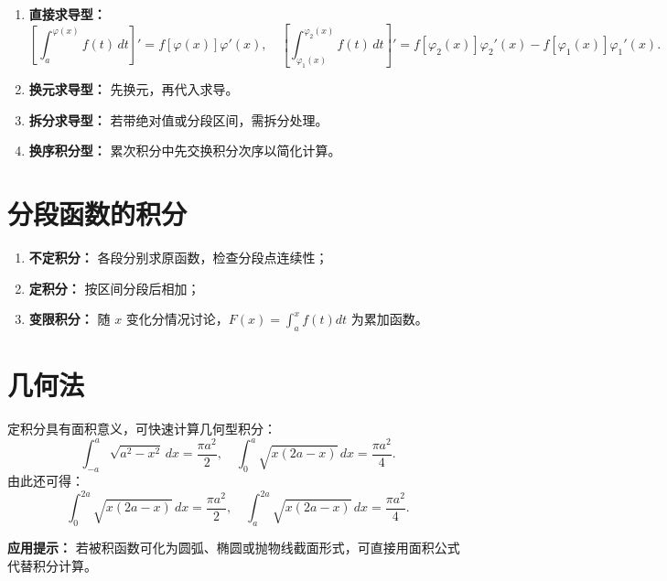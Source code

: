 \begin{enumerate}
    \item \textbf{直接求导型：}
          \[
              \left[\int_{a}^{\varphi(x)} f(t)\,dt\right]' = f[\varphi(x)]\varphi'(x),\quad
              \left[\int_{\varphi_1(x)}^{\varphi_2(x)} f(t)\,dt\right]' = f[\varphi_2(x)]\varphi_2'(x) - f[\varphi_1(x)]\varphi_1'(x).
          \]
    \item \textbf{换元求导型：} 先换元，再代入求导。
    \item \textbf{拆分求导型：} 若带绝对值或分段区间，需拆分处理。
    \item \textbf{换序积分型：} 累次积分中先交换积分次序以简化计算。
\end{enumerate}

\section{分段函数的积分}

\begin{enumerate}
    \item \textbf{不定积分：} 各段分别求原函数，检查分段点连续性；
    \item \textbf{定积分：} 按区间分段后相加；
    \item \textbf{变限积分：} 随 $x$ 变化分情况讨论，$F(x)=\int_a^x f(t)dt$ 为累加函数。
\end{enumerate}

\section{几何法}

定积分具有面积意义，可快速计算几何型积分：
\[
    \int_{-a}^{a}\sqrt{a^2-x^2}\,dx = \frac{\pi a^2}{2}, \quad
    \int_{0}^{a}\sqrt{x(2a-x)}\,dx = \frac{\pi a^2}{4}.
\]
由此还可得：
\[
    \int_{0}^{2a}\sqrt{x(2a-x)}\,dx = \frac{\pi a^2}{2}, \quad
    \int_{a}^{2a}\sqrt{x(2a-x)}\,dx = \frac{\pi a^2}{4}.
\]

\textbf{应用提示：} 若被积函数可化为圆弧、椭圆或抛物线截面形式，可直接用面积公式代替积分计算。